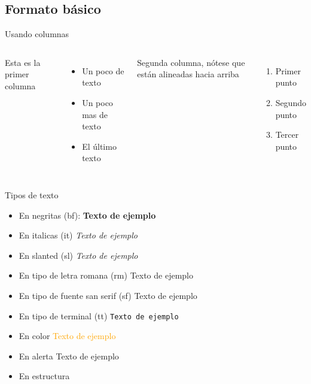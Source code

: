 \subsection{Formato básico} 
\begin{frame}{Usando columnas}
\begin{columns}
     Esta es la primer columna
     \begin{itemize}
         \item Un poco de texto
         \item Un poco mas de texto
         \item El último texto
     \end{itemize}
     Segunda columna, nótese que están alineadas hacia arriba
     \begin{enumerate}
         \item Primer punto
         \item Segundo punto
         \item Tercer punto
     \end{enumerate}
\end{columns}
\end{frame}

\begin{frame}{Tipos de texto}
  \begin{itemize}
    \item En negritas (bf):  \textbf{Texto de ejemplo}
    \item En italicas (it) \textit{Texto de ejemplo}
    \item En slanted (sl) \textsl{Texto de ejemplo}
    \item En tipo de letra romana (rm) \textrm{Texto de ejemplo}
    \item En tipo de fuente san serif (sf) \textsf{Texto de ejemplo}
    \item En tipo de terminal (tt) \texttt{Texto de ejemplo}
    \item En color \textcolor{orange}{Texto de ejemplo}
    \item En alerta \alert{Texto de ejemplo}
    \item En estructura 
  \end{itemize}
\end{frame}

